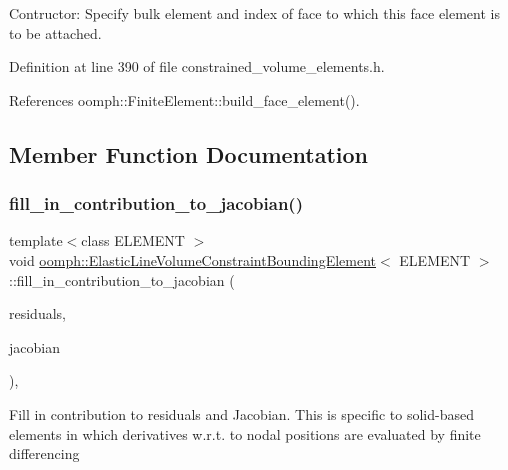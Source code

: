 Contructor\+: Specify bulk element and index of face to which this face element is to be attached. 



Definition at line 390 of file constrained\+\_\+volume\+\_\+elements.\+h.



References oomph\+::\+Finite\+Element\+::build\+\_\+face\+\_\+element().



\subsection{Member Function Documentation}
\mbox{\label{classoomph_1_1ElasticLineVolumeConstraintBoundingElement_a6b9670b4a995765e0b2793a3cab05966}} 
\subsubsection{\texorpdfstring{fill\+\_\+in\+\_\+contribution\+\_\+to\+\_\+jacobian()}{fill\_in\_contribution\_to\_jacobian()}}
{\footnotesize\ttfamily template$<$class E\+L\+E\+M\+E\+NT $>$ \\
void \hyperlink{classoomph_1_1ElasticLineVolumeConstraintBoundingElement}{oomph\+::\+Elastic\+Line\+Volume\+Constraint\+Bounding\+Element}$<$ E\+L\+E\+M\+E\+NT $>$\+::fill\+\_\+in\+\_\+contribution\+\_\+to\+\_\+jacobian (\begin{DoxyParamCaption}\item[{\hyperlink{classoomph_1_1Vector}{Vector}$<$ double $>$ \&}]{residuals,  }\item[{\hyperlink{classoomph_1_1DenseMatrix}{Dense\+Matrix}$<$ double $>$ \&}]{jacobian }\end{DoxyParamCaption})\hspace{0.3cm}{\ttfamily [inline]}, {\ttfamily [virtual]}}

Fill in contribution to residuals and Jacobian. This is specific to solid-\/based elements in which derivatives w.\+r.\+t. to nodal positions are evaluated by finite differencing 

